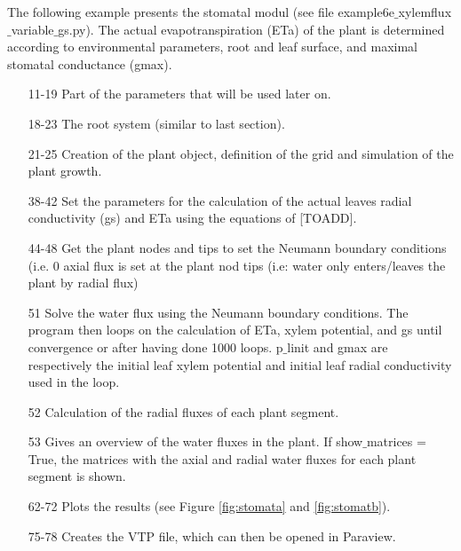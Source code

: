 The following example presents the stomatal modul (see file example6e$\_$xylemflux$\_$variable$\_$gs.py). The actual evapotranspiration (ETa) of the plant is determined according to environmental parameters, root and leaf surface, and maximal stomatal conductance (gmax). 
%
\begin{itemize}

\item[11-19] Part of the parameters that will be used later on.

\item[18-23] The root system (similar to last section). 

\item[21-25] Creation of the plant object, definition of the grid and simulation of the plant growth.

\item[38-42] Set the parameters for the calculation of the actual leaves radial conductivity (gs) and ETa using the equations of [TOADD].

\item[44-48] Get the plant nodes and tips to set the Neumann boundary conditions (i.e. 0 axial flux is set at the plant nod tips (i.e: water only enters/leaves the plant by radial flux)

\item[51] Solve the water flux using the Neumann boundary conditions. The program then loops on the calculation of ETa, xylem potential, and gs until convergence or after having done 1000 loops. p$\_$linit and gmax are respectively the initial leaf xylem potential and initial leaf radial conductivity used in the loop.

\item[52] Calculation of the radial fluxes of each plant segment.

\item[53] Gives an overview of the water fluxes in the plant. If show$\_$matrices = True, the matrices with the axial and radial water fluxes for each plant segment is shown.

\item[62-72] Plots the results (see Figure \ref{fig:stomata} and \ref{fig:stomatb}).

\item[75-78] Creates the VTP file, which can then be opened in Paraview.

\end{itemize}

